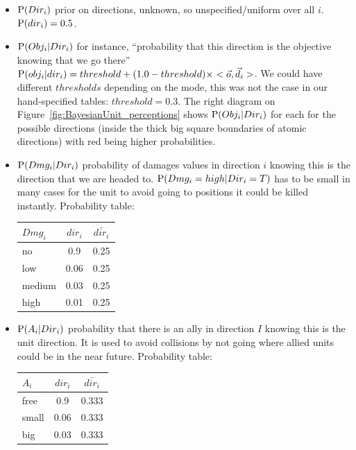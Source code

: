\begin{itemize}
\item $\mathrm{P}(Dir_i)$ prior on directions, unknown, so unspecified/uniform over all $i$. $\mathrm{P}(dir_i) = 0.5$.

\item $\mathrm{P}(Obj_i | Dir_i)$ for instance, ``probability that this direction is the objective knowing that we go there'' $\mathrm{P}(obj_i | dir_i) = threshold + (1.0-threshold)\times <\vec{o},\vec{d_i}>$. %
We could have different $thresholds$ depending on the mode, this was not the case in our hand-specified tables: $threshold = 0.3$. The right diagram on Figure~\ref{fig:BayesianUnit_perceptions} shows $\mathrm{P}(Obj_i|Dir_i)$ for each for the possible directions (inside the thick big square boundaries of atomic directions) with red being higher probabilities.

\item $\mathrm{P}(Dmg_i | Dir_i)$ probability of damages values in direction $i$ knowing this is the direction that we are headed to. $\mathrm{P}(Dmg_i = high | Dir_i = T)$ has to be small in many cases for the unit to avoid going to positions it could be killed instantly. Probability table:\\
\begin{center}
\begin{tabular}{|l|c|c|}
\hline
$Dmg_i$ & $dir_i$ & $\bar{dir_i}$ \\
\hline
no & 0.9 & 0.25 \\
low & 0.06 & 0.25 \\
medium & 0.03 & 0.25 \\
high & 0.01 & 0.25 \\
\hline
\end{tabular}
\end{center}

\item $\mathrm{P}(A_i | Dir_i)$ probability that there is an ally in direction $I$ knowing this is the unit direction. It is used to avoid collisions by not going where allied units could be in the near future. Probability table:\\
\begin{center}
\begin{tabular}{|l|c|c|}
\hline
$A_i$ & $dir_i$ & $\bar{dir_i}$ \\
\hline
free & 0.9 & 0.333 \\
small & 0.06 & 0.333 \\
big & 0.03 & 0.333 \\
\hline
\end{tabular}
\end{center}
 


\end{itemize}
